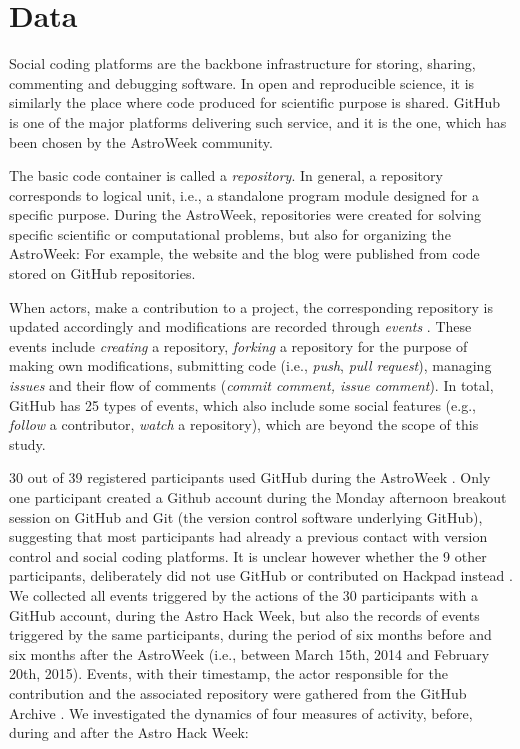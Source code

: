 \section{Data}
\label{sec:data}
Social coding platforms are the backbone infrastructure for storing, sharing, commenting and debugging software. In open and reproducible science, it is similarly the place where code produced for scientific purpose is shared. GitHub is one of the major platforms delivering such service, and it is the one, which has been chosen by the AstroWeek community.

The basic code container is called a {\it repository}. In general, a repository corresponds to logical unit, i.e., a standalone program module designed for a specific purpose. During the AstroWeek, repositories were created for solving specific scientific or computational problems, but also for organizing the AstroWeek: For example, the website and the blog were published from code stored on GitHub repositories. 

When actors, make a contribution to a project, the corresponding repository is updated accordingly and modifications are recorded through {\it events} \cite{github_event_types}. These events include {\it creating} a repository, {\it forking} a repository for the purpose of making own modifications, submitting code (i.e., {\it push}, {\it pull request}), managing {\it issues} and their flow of comments ({\it commit comment, issue comment}). In total, GitHub has 25 types of events, which also include some social features (e.g., {\it follow} a contributor, {\it watch} a repository), which are beyond the scope of this study.

30 out of 39 registered participants used GitHub during the AstroWeek \cite{astroweek_participants}. Only one participant created a Github account during the Monday afternoon breakout session on GitHub and Git (the version control software underlying GitHub), suggesting that most participants had already a previous contact with version control and social coding platforms. It is unclear however whether the 9 other participants, deliberately did not use GitHub or contributed on Hackpad instead \cite{astro_hackpad}. We collected all events triggered by the actions of the 30 participants with a GitHub account, during the Astro Hack Week, but also the records of events triggered by the same participants, during the period of six months before and six months after the AstroWeek (i.e., between March 15th, 2014 and February 20th, 2015). Events, with their timestamp, the actor responsible for the contribution and the associated repository were gathered from the GitHub Archive \cite{github_archive}. We investigated the dynamics of four measures of activity, before, during and after the Astro Hack Week:  

